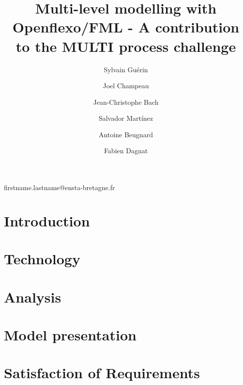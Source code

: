 \documentclass[american]{emisa}
\newcommand{\noteSM}[1]{\todo[color=red!40, author=\textbf{Salvador}, inline, caption={}]{#1}}
\newcommand{\noteJC}[1]{\todo[color=pink!40, author=\textbf{JC}, inline, caption={}]{#1}}
\newcommand{\noteSylvain}[1]{\todo[color=green!40, author=\textbf{Sylvain}, inline, caption={}]{#1}}
\newcommand{\noteAntoine}[1]{\todo[color=yellow!40, author=\textbf{Antoine}, inline, caption={}]{#1}}
\newcommand{\noteFabien}[1]{\todo[color=orange!40, author=\textbf{Fabien}, inline, caption={}]{#1}}
\newcommand{\noteJoel}[1]{\todo[color=blue!20, author=\textbf{Joel}, inline, caption={}]{#1}}
\newcommand{\mpc}{MULTI process challenge\xspace}
\begin{document}
\begin{article}{
    \title{Multi-level modelling with Openflexo/FML - A contribution to the \mpc}

    \author*{Sylvain Guérin}{firstname.lastname@ensta-bretagne.fr}
    \address{ENSTA Bretagne, Lab-STICC, UMR 6285, Brest, France}

    \author{Joel Champeau}
    \address[a]{}

    \author{Jean-Christophe Bach}
    \address{IMT Atlantique, Lab-STICC, UMR 6285, 29238 Brest, France}

    \author{Salvador Mart\'inez}
    \address[b]{}

    \author{Antoine Beugnard}
    \address[b]{}

    \author{Fabien Dagnat}
    \address[b]{}

    \abstract{}
    
}

\section{Introduction}
\label{sec:introduction}



\section{Technology}
\label{sec:technology}


\section{Analysis}
\label{sec:analysis}


\section{Model presentation}
\label{sec:model}


\section{Satisfaction of Requirements}
\label{sec:requirements}



\end{article}
\end{document}

